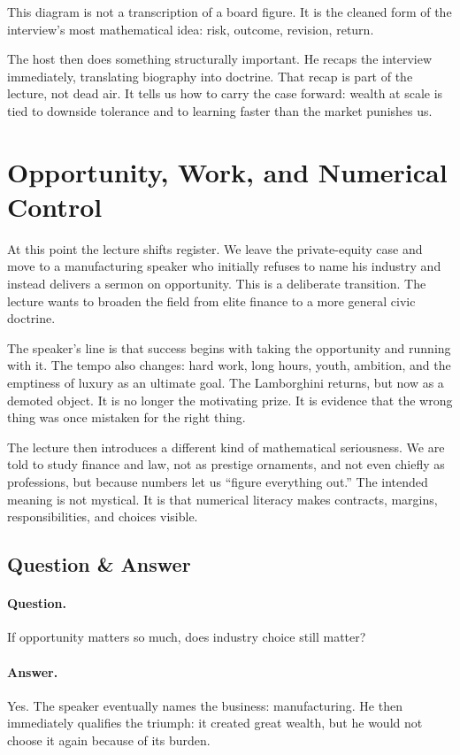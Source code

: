 This diagram is not a transcription of a board figure. It is the cleaned form of the interview's most mathematical idea: risk, outcome, revision, return.

The host then does something structurally important. He recaps the interview immediately, translating biography into doctrine. That recap is part of the lecture, not dead air. It tells us how to carry the case forward: wealth at scale is tied to downside tolerance and to learning faster than the market punishes us.

\section{Opportunity, Work, and Numerical Control}

At this point the lecture shifts register. We leave the private-equity case and move to a manufacturing speaker who initially refuses to name his industry and instead delivers a sermon on opportunity. This is a deliberate transition. The lecture wants to broaden the field from elite finance to a more general civic doctrine.

The speaker's line is that success begins with taking the opportunity and running with it. The tempo also changes: hard work, long hours, youth, ambition, and the emptiness of luxury as an ultimate goal. The Lamborghini returns, but now as a demoted object. It is no longer the motivating prize. It is evidence that the wrong thing was once mistaken for the right thing.

The lecture then introduces a different kind of mathematical seriousness. We are told to study finance and law, not as prestige ornaments, and not even chiefly as professions, but because numbers let us ``figure everything out.'' The intended meaning is not mystical. It is that numerical literacy makes contracts, margins, responsibilities, and choices visible.

\subsection{Question \& Answer}

\paragraph{Question.} If opportunity matters so much, does industry choice still matter?

\paragraph{Answer.} Yes. The speaker eventually names the business: manufacturing. He then immediately qualifies the triumph: it created great wealth, but he would not choose it again because of its burden.

